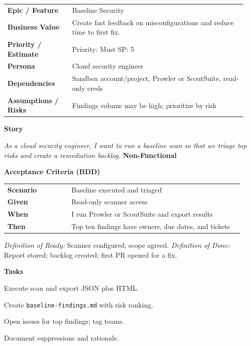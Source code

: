 \documentclass[11pt,letterpaper]{article}
\makeatletter
\newenvironment{kvtable}{%
  \begin{tabular}{@{}>{\bfseries\arraybackslash}p{0.26\linewidth} p{0.70\linewidth}@{}}
}{\end{tabular}}
\newenvironment{bdd}{%
  \begin{tabular}{@{}>{\bfseries\arraybackslash}p{0.26\linewidth} p{0.70\linewidth}@{}}
}{\end{tabular}}
\newcommand{\DoRDoD}[2]{%
  \vspace{0.35em}
  {\footnotesize\color{Muted}%
    \textit{Definition of Ready:} #1 \; \textbullet\;
    \textit{Definition of Done:} #2%
  }%
}
\newenvironment{storycard}[2]{%
  \begin{tcolorbox}[cloudcard, title={#1 --- #2}]%
}{\end{tcolorbox}}
\newcommand{\sectionlabel}[1]{\vspace{0.35em}\textbf{#1}\par}
\makeatother
\begin{document}
\begin{storycard}{CCS-3}{Ch. 3 — Security Baselines}
\begin{kvtable}
Epic / Feature & Baseline Security\\
Business Value & Create fast feedback on misconfigurations and reduce time to first fix.\\
Priority / Estimate & Priority: Must \quad SP: 5\\
Persona & Cloud security engineer\\
Dependencies & Sandbox account/project, Prowler or ScoutSuite, read-only creds\\
Assumptions / Risks & Findings volume may be high; prioritize by risk\\
\end{kvtable}
\sectionlabel{Story}
\textit{As a cloud security engineer, I want to run a baseline scan so that we triage top risks and create a remediation backlog.}
\sectionlabel{Non-Functional}\;\;
\sectionlabel{Acceptance Criteria (BDD)}
\begin{bdd}
Scenario & Baseline executed and triaged\\
Given & Read-only scanner access\\
When & I run Prowler or ScoutSuite and export results\\
Then & Top ten findings have owners, due dates, and tickets\\
\end{bdd}
\DoRDoD{Scanner configured; scope agreed.}{Report stored; backlog created; first PR opened for a fix.}
\sectionlabel{Tasks}
\begin{checklist}
\item Execute scan and export JSON plus HTML.
\item Create \texttt{baseline-findings.md} with risk ranking.
\item Open issues for top findings; tag teams.
\item Document suppressions and rationale.
\end{checklist}
\end{storycard}
\end{document}
